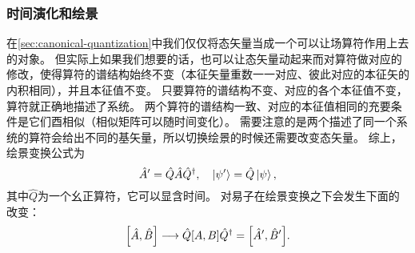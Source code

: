 \documentclass[UTF8, a4paper]{ctexart}
\begin{document}
\subsubsection{时间演化和绘景}\label{sec:time-evolution}
在\autoref{sec:canonical-quantization}中我们仅仅将态矢量当成一个可以让场算符作用上去的对象。
但实际上如果我们想要的话，也可以让态矢量动起来而对算符做对应的修改，使得算符的谱结构始终不变（本征矢量重数一一对应、彼此对应的本征矢的内积相同），并且本征值不变。
只要算符的谱结构不变、对应的各个本征值不变，算符就正确地描述了系统。
两个算符的谱结构一致、对应的本征值相同的充要条件是它们酉相似（相似矩阵可以随时间变化）。
需要注意的是两个描述了同一个系统的算符会给出不同的基矢量，所以切换绘景的时候还需要改变态矢量。
综上，绘景变换公式为
\begin{equation}
    \hat{A}' = \hat{Q} \hat{A} \hat{Q}^\dagger, \quad \ket{\psi'} = \hat{Q} \ket{\psi},
    \label{eq:picture-trans}
\end{equation}
其中$\hat{Q}$为一个幺正算符，它可以显含时间。
对易子在绘景变换之下会发生下面的改变：
\begin{equation}
    \comm{\hat{A}}{\hat{B}} \longrightarrow \hat{Q} \comm{A}{B} \hat{Q}^\dagger = \comm{\hat{A}'}{\hat{B}'}.
\end{equation}
\end{document}
